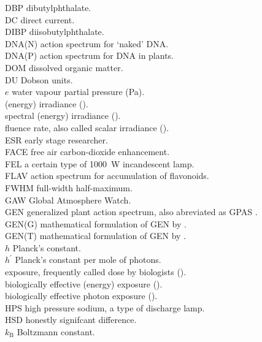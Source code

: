 \begin{tabbing}
DBP \> dibutylphthalate.\\
DC \> direct current.\\
DIBP \> diisobutylphthalate.\\
DNA(N) \> \UV action spectrum for `naked' DNA.\\
DNA(P) \> \UV action spectrum for DNA in plants.\\
DOM \> dissolved organic matter.\\
DU \> Dobson units.\\
$e$ \> water vapour partial pressure (Pa).\\
\irr \> (energy) irradiance (\watt).\\
\sirr \> spectral (energy) irradiance (\wattnm).\\
\flrat \> fluence rate, also called scalar irradiance (\watt).\\
ESR \> early stage researcher.\\
FACE \> free air carbon-dioxide enhancement.\\
FEL \> a certain type of 1000~W incandescent lamp.\\
FLAV \> \UV action spectrum for accumulation of flavonoids.\\
FWHM \> full-width half-maximum.\\
GAW \> Global Atmosphere Watch.\\
GEN \> generalized plant action spectrum, also abreviated as GPAS \citep{Caldwell1971}.\\
GEN(G) \> mathematical formulation of GEN by \citet{Green1974} .\\
GEN(T) \> mathematical formulation of GEN by \citet{Thimijan1978}.\\
$h$ \> Planck's constant.\\
$h^\prime$ \> Planck's constant per mole of photons.\\
\exposure \> exposure, frequently called dose by biologists (\kjday).\\
\dose[BE]  \> biologically effective (energy) exposure (\kjday).\\
\qdose[BE] \> biologically effective photon exposure (\molday).\\
HPS \> high pressure sodium, a type of discharge lamp.\\
HSD \> honestly signifcant difference.\\
$k_\mathrm{B}$ \> Boltzmann constant.\\

\end{tabbing}

